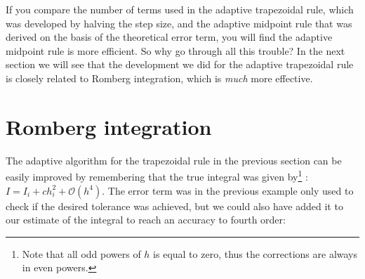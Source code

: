 \documentclass[graybox,sectrefs,envcountresetchap,open=right,final]{svmonodo}
\begin{document}
If you compare the number of terms used in the adaptive trapezoidal rule, which was developed by halving the step size, and the adaptive midpoint rule that was derived on the basis of the theoretical error term, you will find the adaptive midpoint rule is more efficient. So why go through all this trouble? In the next section we will see that the development we did for the adaptive trapezoidal rule is closely related to Romberg integration, which is \emph{much} more effective.

\section{Romberg integration}
The adaptive algorithm for the trapezoidal rule in the previous section can be easily improved by remembering 
that the true integral was given by\footnote{Note that all odd powers of $h$ is equal to zero, thus the corrections are always in even powers.} : $I=I_i+ch_i^2+\mathcal{O}(h^4)$. The error term was in the previous example only used to 
check if the desired tolerance was achieved, but we could also have added it to our estimate of the integral to reach an accuracy to fourth order:
\end{document}
